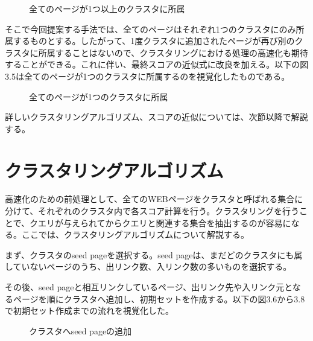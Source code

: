 \documentclass[a4paper,11pt]{jreport}
\begin{document}
\begin{figure}[htbp]
\begin{center}
\end{center}
\caption{全てのページが1つ以上のクラスタに所属}
\label{figure:sample}
\end{figure}

そこで今回提案する手法では、全てのページはそれぞれ1つのクラスタにのみ所属するものとする。したがって、1度クラスタに追加されたページが再び別のクラスタに所属することはないので、クラスタリングにおける処理の高速化も期待することができる。これに伴い、最終スコアの近似式に改良を加える。以下の図3.5は全てのページが1つのクラスタに所属するのを視覚化したものである。

\begin{figure}[htbp]
\begin{center}
\end{center}
\caption{全てのページが1つのクラスタに所属}
\label{figure:sample}
\end{figure}

詳しいクラスタリングアルゴリズム、スコアの近似については、次節以降で解説する。

\clearpage

\section{クラスタリングアルゴリズム}

高速化のための前処理として、全てのWEBページをクラスタと呼ばれる集合に分けて、それぞれのクラスタ内で各スコア計算を行う。クラスタリングを行うことで、クエリが与えられてからクエリと関連する集合を抽出するのが容易になる。ここでは、クラスタリングアルゴリズムについて解説する。

まず、クラスタのseed pageを選択する。seed pageは、まだどのクラスタにも属していないページのうち、出リンク数、入リンク数の多いものを選択する。

その後、seed pageと相互リンクしているページ、出リンク先や入リンク元となるページを順にクラスタへ追加し、初期セットを作成する。以下の図3.6から3.8で初期セット作成までの流れを視覚化した。

\begin{figure}[htbp]
\begin{center}
\end{center}
\caption{クラスタへseed pageの追加}
\label{figure:sample}
\end{figure}
\end{document}
